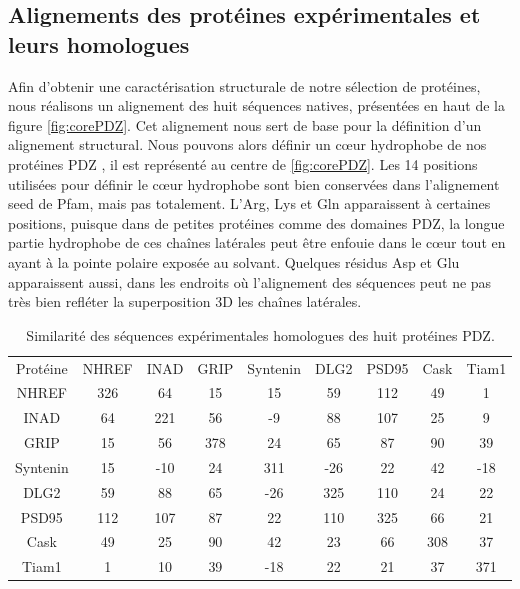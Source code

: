 \subsection{Alignements des protéines expérimentales et leurs homologues}

Afin d'obtenir une caractérisation structurale de notre sélection de protéines, nous réalisons un alignement des huit séquences natives, présentées en haut de la figure \ref{fig:corePDZ}. Cet alignement nous sert de base pour la définition d'un alignement structural. Nous pouvons alors définir un cœur hydrophobe de nos protéines \og PDZ \fg , il est représenté au centre de \ref{fig:corePDZ}. Les 14 positions utilisées pour définir le cœur hydrophobe sont bien conservées dans l'alignement \og seed \fg de Pfam, mais pas totalement. L'Arg, Lys et Gln apparaissent à certaines positions, puisque dans de petites protéines comme des domaines PDZ, la longue partie hydrophobe de ces chaînes latérales peut être enfouie dans le cœur tout en ayant à la pointe polaire exposée au solvant. Quelques résidus Asp et Glu apparaissent aussi, dans les endroits où l'alignement des séquences peut ne pas très bien refléter la superposition 3D les chaînes latérales.

    \begin{table}[!htbp]
      \centering
      \caption{Similarité des séquences expérimentales homologues des huit protéines PDZ.}
      \begin{tabular}{ccccccccc}
        \toprule
        Protéine & NHREF        & INAD      & GRIP        & Syntenin        & DLG2       & PSD95       & Cask       & Tiam1 \\
        \cmidrule{1-9}

        NHREF    & 326 &  64 &  15 &  15 &  59 & 112 & 49  &   1  \\     
        INAD    &  64 & 221 &  56 &  -9 &  88 & 107 & 25  &   9  \\
        GRIP    &  15 &  56 & 378 &  24 &  65 &  87 & 90  &  39  \\
        Syntenin    &  15 & -10 &  24 & 311 & -26 &  22 & 42  & -18  \\
        DLG2    &  59 &  88 &  65 & -26 & 325 & 110 & 24  &  22  \\
        PSD95    & 112 & 107 &  87 &  22 & 110 & 325 & 66  &  21  \\
        Cask    &  49 &  25 &  90 &  42 &  23 &  66 & 308 & 37   \\
        Tiam1   &  1  &  10 &  39 & -18 &  22 &  21 & 37  & 371 \\
        \bottomrule
      \end{tabular} 
\label{tab:Xsimil}      
    \end{table}

